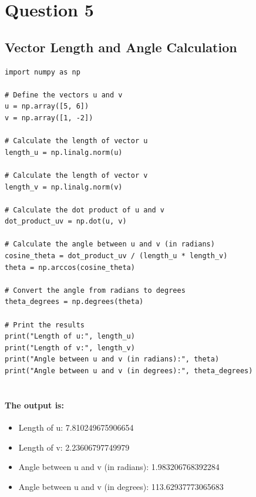 \section{Question 5}
% 
% 
\subsection{Vector Length and Angle Calculation}
% 
% 
\begin{lstlisting}[style=pystyle]
import numpy as np

# Define the vectors u and v
u = np.array([5, 6])
v = np.array([1, -2])

# Calculate the length of vector u
length_u = np.linalg.norm(u)

# Calculate the length of vector v
length_v = np.linalg.norm(v)

# Calculate the dot product of u and v
dot_product_uv = np.dot(u, v)

# Calculate the angle between u and v (in radians)
cosine_theta = dot_product_uv / (length_u * length_v)
theta = np.arccos(cosine_theta)

# Convert the angle from radians to degrees
theta_degrees = np.degrees(theta)

# Print the results
print("Length of u:", length_u)
print("Length of v:", length_v)
print("Angle between u and v (in radians):", theta)
print("Angle between u and v (in degrees):", theta_degrees)
    
\end{lstlisting}
% 
% 
\paragraph{\textbf{The output is:}}
\begin{itemize}
    \item Length of u: 7.810249675906654
    \item Length of v: 2.23606797749979
    \item Angle between u and v (in radians): 1.983206768392284
    \item Angle between u and v (in degrees): 113.62937773065683
\end{itemize}
% 
% 
% 
% 
% 
% 
\newpage
